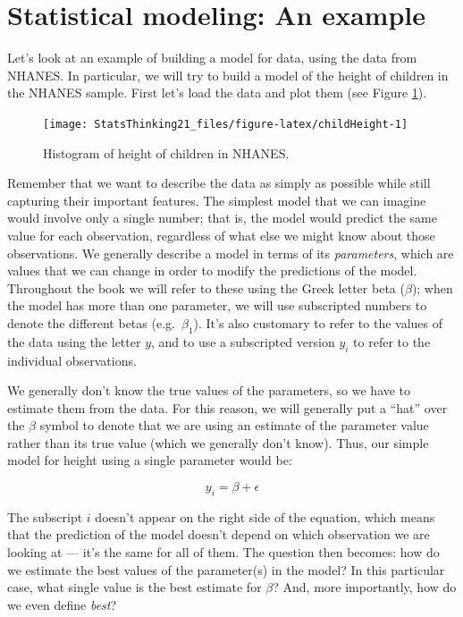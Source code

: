 \documentclass[
  12pt,
]{book}
\begin{document}
\hypertarget{statistical-modeling-an-example}{%
\section{Statistical modeling: An example}\label{statistical-modeling-an-example}}

Let's look at an example of building a model for data, using the data from NHANES. In particular, we will try to build a model of the height of children in the NHANES sample. First let's load the data and plot them (see Figure \ref{fig:childHeight}).

\begin{figure}
\texttt{[image: StatsThinking21\_files/figure-latex/childHeight-1]} \caption{Histogram of height of children in NHANES.}\label{fig:childHeight}
\end{figure}

Remember that we want to describe the data as simply as possible while still capturing their important features. The simplest model that we can imagine would involve only a single number; that is, the model would predict the same value for each observation, regardless of what else we might know about those observations. We generally describe a model in terms of its \emph{parameters}, which are values that we can change in order to modify the predictions of the model. Throughout the book we will refer to these using the Greek letter beta (\(\beta\)); when the model has more than one parameter, we will use subscripted numbers to denote the different betas (e.g.~\(\beta_1\)). It's also customary to refer to the values of the data using the letter \(y\), and to use a subscripted version \(y_i\) to refer to the individual observations.

We generally don't know the true values of the parameters, so we have to estimate them from the data. For this reason, we will generally put a ``hat'' over the \(\beta\) symbol to denote that we are using an estimate of the parameter value rather than its true value (which we generally don't know). Thus, our simple model for height using a single parameter would be:

\[
y_i = \beta + \epsilon
\]

The subscript \(i\) doesn't appear on the right side of the equation, which means that the prediction of the model doesn't depend on which observation we are looking at --- it's the same for all of them. The question then becomes: how do we estimate the best values of the parameter(s) in the model? In this particular case, what single value is the best estimate for \(\beta\)? And, more importantly, how do we even define \emph{best}?
\end{document}
